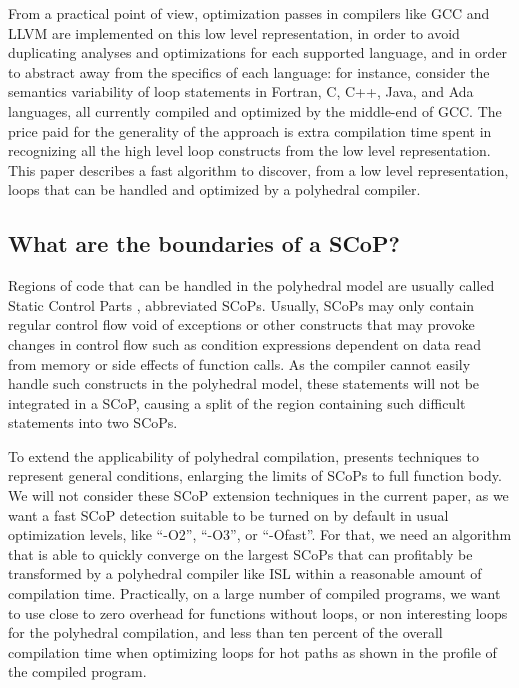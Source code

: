 \documentclass{sigplanconf}
\begin{document}
From a practical point of view, optimization passes in compilers like GCC and
LLVM are implemented on this low level representation, in order to avoid
duplicating analyses and optimizations for each supported language, and in order
to abstract away from the specifics of each language: for instance, consider the
semantics variability of loop statements in Fortran, C, C++, Java, and Ada
languages, all currently compiled and optimized by the middle-end of GCC.  The
price paid for the generality of the approach is extra compilation time spent in
recognizing all the high level loop constructs from the low level
representation.  This paper describes a fast algorithm to discover, from a low
level representation, loops that can be handled and optimized by a polyhedral
compiler.

\subsection{What are the boundaries of a SCoP?}

Regions of code that can be handled in the polyhedral model are usually called
Static Control Parts \cite{Bondhugula}, abbreviated SCoPs.
Usually, SCoPs may only contain regular
control flow void of exceptions or other constructs that may provoke changes in
control flow such as condition expressions dependent on data read from memory or
side effects of function calls.  As the compiler cannot easily handle such
constructs in the polyhedral model, these statements will not be integrated in a
SCoP, causing a split of the region containing such difficult statements into
two SCoPs.

To extend the applicability of polyhedral compilation, \cite{scopExtend}
presents techniques to represent general conditions, enlarging the limits of
SCoPs to full function body.  We will not consider these SCoP extension
techniques in the current paper, as we want a fast SCoP detection suitable to be
turned on by default in usual optimization levels, like ``-O2'', ``-O3'', or
``-Ofast''.  For that, we need an algorithm that is able to quickly converge on
the largest SCoPs that can profitably be transformed by a polyhedral compiler
like ISL \cite{verdoolaege2010isl} within a reasonable amount of compilation time.
Practically, on a large number of compiled programs, we want to use close to
zero overhead for functions without loops, or non interesting loops for the
polyhedral compilation, and less than ten percent of the overall compilation
time when optimizing loops for hot paths as shown in the profile of the compiled
program.
\end{document}
